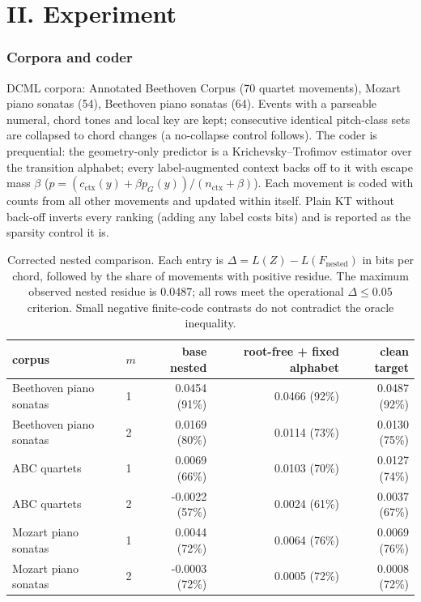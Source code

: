\documentclass[11pt]{article}
\begin{document}
\part*{II. Experiment}
\section{Corpora and coder}
DCML corpora: Annotated Beethoven Corpus (70 quartet movements), Mozart piano sonatas (54), Beethoven piano sonatas (64). Events with a parseable numeral, chord tones and local key are kept; consecutive identical pitch-class sets are collapsed to chord changes (a no-collapse control follows). The coder is prequential: the geometry-only predictor is a Krichevsky--Trofimov estimator over the transition alphabet; every label-augmented context backs off to it with escape mass $\beta$ ($p=(c_{\mathrm{ctx}}(y)+\beta p_G(y))/(n_{\mathrm{ctx}}+\beta)$). Each movement is coded with counts from all other movements and updated within itself. Plain KT without back-off inverts every ranking (adding any label costs bits) and is reported as the sparsity control it is.

\begin{table}[t]\centering\small
\caption{Corrected nested comparison. Each entry is $\Delta=L(Z)-L(F_{\mathrm{nested}})$ in bits per chord, followed by the share of movements with positive residue. The maximum observed nested residue is 0.0487; all rows meet the operational $\Delta\le0.05$ criterion. Small negative finite-code contrasts do not contradict the oracle inequality.}\label{tab:nested}
\begin{tabular}{llrrr}\toprule corpus & $m$ & base nested & root-free + fixed alphabet & clean target \\ \midrule
Beethoven piano sonatas & 1 & 0.0454 (91\%) & 0.0466 (92\%) & 0.0487 (92\%) \\
Beethoven piano sonatas & 2 & 0.0169 (80\%) & 0.0114 (73\%) & 0.0130 (75\%) \\
ABC quartets & 1 & 0.0069 (66\%) & 0.0103 (70\%) & 0.0127 (74\%) \\
ABC quartets & 2 & -0.0022 (57\%) & 0.0024 (61\%) & 0.0037 (67\%) \\
Mozart piano sonatas & 1 & 0.0044 (72\%) & 0.0064 (76\%) & 0.0069 (76\%) \\
Mozart piano sonatas & 2 & -0.0003 (72\%) & 0.0005 (72\%) & 0.0008 (72\%) \\
\bottomrule\end{tabular}\end{table}
\end{document}
